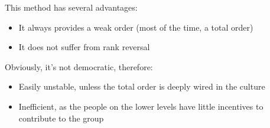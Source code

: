 This method has several advantages:
\begin{itemize}
	\item It always provides a weak order (most of the time, a total order)
	
	\item It does not suffer from rank reversal
\end{itemize}

Obviously, it's not democratic, therefore: 
\begin{itemize}
	\item Easily unstable, unless the total order is deeply wired in the culture
	
	\item Inefficient, as the people on the lower levels have little incentives to contribute to the group 
\end{itemize}

